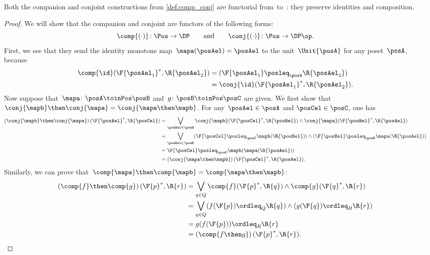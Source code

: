 \begin{lemma}
  \label{prop:comp_conj}
  Both the companion and conjoint constructions from \cref{def:comp_conj} are functorial from~\Pos to~\DP: they preserve identities and composition.
\end{lemma}
\begin{proof}
  We will show that the companion and conjoint are functors of the following forms:
  \begin{equation}
    \comp{(\cdot)}\colon\Pos\to\DP
    \qquad\text{and}\qquad
    \conj{(\cdot)}\colon\Pos\to\DP\op.
  \end{equation}
  First, we see that they send the identity monotone map~$\mapa(\posAel)=\posAel$ to the unit~$\Unit{\posA }$ for any poset~$\posA $, because
  \begin{equation}
    \begin{aligned}
      \comp{\id}(\F{\posAel_1}^*,\R{\posAel_2})&= (\F{\posAel_1} \posleq_{\posA} \R{\posAel_2})\\
      &=\conj{\id}(\F{\posAel_1}^*,\R{\posAel_2}).
    \end{aligned}
  \end{equation}
  Now suppose that~$\mapa\colon  \posA \toinPos \posB $ and~$g\colon \posB \toinPos \posC$ are given. We first show that $\conj{\mapb}\then\conj{\mapa}=\conj{\mapa\then \mapb}$.
  For any~$\posAel\in \posA$ and $\posCel\in \posC$, one has
  \begin{equation}
    \begin{aligned}
      \left(\conj{\mapb}\then \conj{\mapa}\right)(\F{\posAel}^*,\R{\posCel})
      &=\bigvee_{\posBel\in \posB} \conj{\mapb}(\F{\posCel}^*,\R{\posBel})\wedge\conj{\mapa}(\F{\posBel}^*,\R{\posAel})\\
      &=\bigvee_{\posBel\in \posB} (\F{\posCel}\posleq_\posC \mapb(\R{\posBel})) \wedge (\F{\posBel}\posleq_\posB \mapa(\R{\posAel})) \\
      &= \F{\posCel}\posleq_\posC \mapb(\mapa(\R{\posAel}))\\
      &=\left(\conj{\mapa\then \mapb}\right)(\F{\posCel}^*,\R{\posAel}).
    \end{aligned}
  \end{equation}
  Similarly, we can prove that~$\comp{\mapa}\then \comp{\mapb}=\comp{\mapa\then \mapb}$:
  \begin{equation}
    \begin{aligned}
      \left(\comp{f}\then \comp{g}\right)(\F{p}^*,\R{r})&=\bigvee_{q\in Q} \comp{f}(\F{p}^*,\R{q})\wedge\comp{g}(\F{q}^*,\R{r})\\
      &=\bigvee_{q\in Q} (f(\F{p})\ordleq_Q \R{q})\wedge (g(\F{q})\ordleq_R \R{r})\\
      &=g(f(\F{p}))\ordleq_R \R{r}\\
      &=\left(\comp{f\then g}\right)(\F{p}^*,\R{r}).
    \end{aligned}
  \end{equation}
\end{proof}

